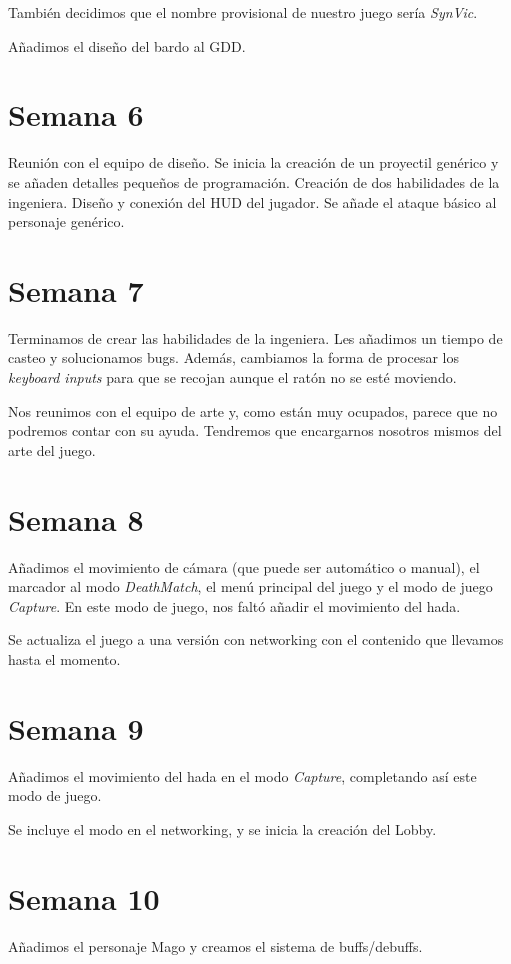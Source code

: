 \documentclass{article}
\begin{document}
También decidimos que el nombre provisional de nuestro juego sería \emph{SynVic}.

Añadimos el diseño del bardo al GDD.

\section*{Semana 6}
Reunión con el equipo de diseño. Se inicia la creación de un proyectil genérico y se añaden detalles pequeños de programación. Creación de dos habilidades de la ingeniera. Diseño y conexión del HUD del jugador. Se añade el ataque básico al personaje genérico.

\section*{Semana 7}
Terminamos de crear las habilidades de la ingeniera. Les añadimos un tiempo de casteo y solucionamos bugs. Además, cambiamos la forma de procesar los \emph{keyboard inputs} para que se recojan aunque el ratón no se esté moviendo.

Nos reunimos con el equipo de arte y, como están muy ocupados, parece que no podremos contar con su ayuda. Tendremos que encargarnos nosotros mismos del arte del juego.

\section*{Semana 8}	
Añadimos el movimiento de cámara (que puede ser automático o manual), el marcador al modo \emph{DeathMatch}, el menú principal del juego y el modo de juego \emph{Capture}. En este modo de juego, nos faltó añadir el movimiento del hada.

Se actualiza el juego a una versión con networking con el contenido que llevamos hasta el momento.

\section*{Semana 9}
Añadimos el movimiento del hada en el modo \emph{Capture}, completando así este modo de juego.

Se incluye el modo en el networking, y se inicia la creación del Lobby.

\section*{Semana 10}
Añadimos el personaje Mago y creamos el sistema de buffs/debuffs. 
\end{document}
